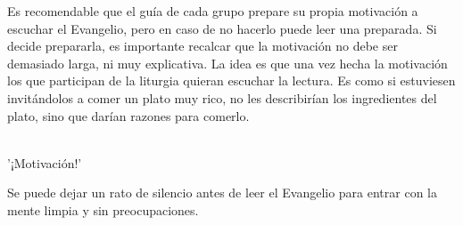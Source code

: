Es recomendable que el guía de cada grupo prepare su propia motivación a escuchar el Evangelio, pero en caso de no hacerlo puede leer una preparada. Si decide prepararla, es importante recalcar que la motivación no debe ser demasiado larga, ni muy explicativa. La idea es que una vez hecha la motivación los que participan de la liturgia quieran escuchar la lectura. Es como si estuviesen invitándolos a comer un plato muy rico, no les describirían los ingredientes del plato, sino que darían razones para comerlo.

\hfill \\ \hfill
'¡Motivación!'
\hfill \\ \hfill
    
Se puede dejar un rato de silencio antes de leer el Evangelio para entrar con la mente limpia y sin preocupaciones.
    
\newpage